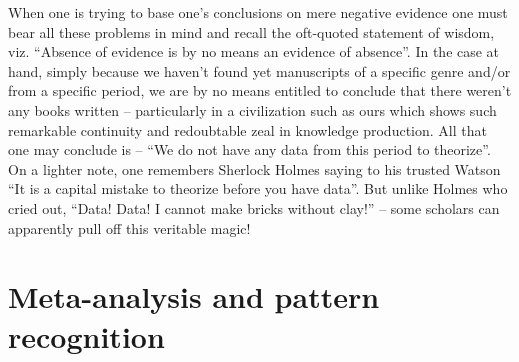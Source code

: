 When one is trying to base one’s conclusions on mere negative evidence one must bear all these problems in mind and recall the oft-quoted statement of wisdom, viz. “Absence of evidence is by no means an evidence of absence”. In the case at hand, simply because we haven’t found yet manuscripts of a specific genre and/or from a specific period, we are by no means entitled to conclude that there weren’t any books written – particularly in a civilization such as ours which shows such remarkable continuity and redoubtable zeal in knowledge production. All that one may conclude is – “We do not have any data from this period to theorize”. On a lighter note, one remembers Sherlock Holmes saying to his trusted Watson “It is a capital mistake to theorize before you have data”. But unlike Holmes who cried out, “Data! Data! I cannot make bricks without clay!” – some scholars can apparently pull off this veritable magic!

\section{Meta-analysis and pattern recognition}

